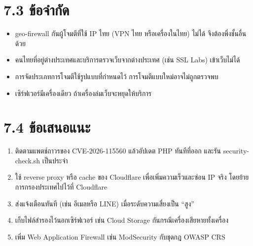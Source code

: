 \section*{7.3 ข้อจำกัด}

\begin{itemize}
\tightlist
\item
  geo-firewall กันผู้โจมตีที่ใช้ IP ไทย (VPN ไทย หรือเครื่องในไทย) ไม่ได้ จึงต้องพึ่งชั้นอื่นด้วย
\item
  คนไทยที่อยู่ต่างประเทศและบริการตรวจเว็บจากต่างประเทศ (เช่น SSL Labs) เข้าเว็บไม่ได้
\item
  การจัดประเภทการโจมตีใช้รูปแบบที่กำหนดไว้ การโจมตีแบบใหม่อาจไม่ถูกตรวจพบ
\item
  เซิร์ฟเวอร์มีเครื่องเดียว ถ้าเครื่องล่มเว็บจะหยุดให้บริการ
\end{itemize}

\section*{7.4 ข้อเสนอแนะ}

\begin{enumerate}
\def\labelenumi{\arabic{enumi}.}
\tightlist
\item
  ติดตามแพตช์ถาวรของ CVE-2026-115560 แล้วอัปเดต PHP ทันทีที่ออก และรัน security-check.sh เป็นประจำ
\item
  ใช้ reverse proxy หรือ cache ของ Cloudflare เพื่อเพิ่มความเร็วและซ่อน IP จริง โดยย้ายการกรองประเทศไปไว้ที่ Cloudflare
\item
  ส่งแจ้งเตือนทันที (เช่น อีเมลหรือ LINE) เมื่อระดับความเสี่ยงเป็น ``สูง''
\item
  เก็บไฟล์สำรองไว้นอกเซิร์ฟเวอร์ เช่น Cloud Storage กันกรณีเครื่องเสียหายทั้งเครื่อง
\item
  เพิ่ม Web Application Firewall เช่น ModSecurity กับชุดกฎ OWASP CRS
\end{enumerate}

